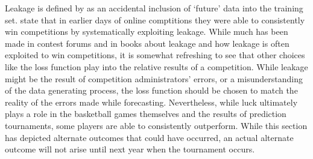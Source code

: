 Leakage is defined by \cite{schutt2013doing} as an accidental inclusion of `future' data into the training set. \cite{schutt2013doing} state that in earlier days of online comptitions they were able to consistently win competitions by systematically exploiting leakage. While much has been made in contest forums and in books  about leakage and how leakage is often exploited to win competitions, it is somewhat refreshing to see that other choices like the loss function play into the relative results of a competition. While leakage might be the result of competition administrators' errors, or a misunderstanding of the data generating process, the loss function should be chosen to match the reality of the errors made while forecasting. Nevertheless, while luck ultimately plays a role in the basketball games themselves and the results of prediction tournaments, some players are able to consistently outperform. While this section has depicted alternate outcomes that could have occurred, an actual alternate outcome will not arise until next year when the tournament occurs.  
